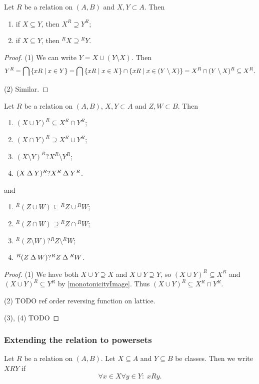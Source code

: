 \begin{corollary} \label{monotonicityPolars}
Let $R$ be a relation on $(A, B)$ and $X,Y\subset A$. Then
\begin{enumerate}
\item if $X\subseteq Y$, then $X^R \supseteq Y^R$;
\item if $X\subseteq Y$, then ${^RX} \supseteq {^RY}$.
\end{enumerate}
\end{corollary}
\begin{proof}
(1) We can write $Y = X \cup (Y\setminus X)$. Then
\[ Y^R = \bigcap \left\{ xR \;\middle|\; x\in Y \right\} = \bigcap \left\{ xR \;\middle|\; x\in X \right\}\cap\left\{ xR \;\middle|\; x\in (Y\setminus X) \right\} = X^R \cap (Y\setminus X)^R \subseteq X^R. \]

(2) Similar.
\end{proof}
\begin{corollary} \label{polarasRelation}
Let $R$ be a relation on $(A, B)$, $X,Y\subset A$ and $Z,W\subset B$. Then
\begin{enumerate}
\item $(X\cup Y)^R \subseteq X^R\cap Y^R$;
\item $(X\cap Y)^R \supseteq X^R\cup Y^R$;
\item $(X\setminus Y)^R ? X^R\setminus Y^R$;
\item $(X\mathbin{\Delta} Y)^R ? X^R\mathbin{\Delta} Y^R$.
\end{enumerate}
and
\begin{enumerate}
\item $^R(Z\cup W) \subseteq {^RZ}\cup {^RW}$;
\item $^R(Z\cap W) \supseteq {^RZ}\cap {^RW}$;
\item $^R(Z\setminus W) ? {^RZ}\setminus {^RW}$;
\item $^R(Z\mathbin{\Delta} W) ? {^RZ}\mathbin{\Delta} {^RW}$.
\end{enumerate}
\end{corollary}
\begin{proof}\mbox{}
(1) We have both $X\cup Y \supseteq X$ and $X\cup Y \supseteq Y$, so $(X\cup Y)^R \subseteq X^R$ and $(X\cup Y)^R \subseteq Y^R$ by \ref{monotonicityImage}. Thus $(X\cup Y)^R \subseteq X^R\cap Y^R$.

(2) TODO ref order reversing function on lattice.

(3), (4) TODO
\end{proof}

\subsubsection{Extending the relation to powersets}
\begin{definition}
Let $R$ be a relation on $(A,B)$. Let $X\subseteq A$ and $Y\subseteq B$ be classes. Then we write $XRY$ if
\[ \forall x\in X \forall y\in Y: \; xRy. \]
\end{definition}

